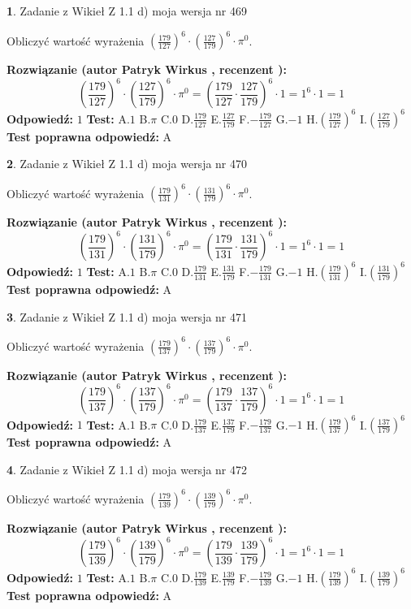\documentclass[12pt, a4paper]{article}
\theoremstyle{definition} %
\newtheorem{zad}{}
\newcommand{\zadStart}[1]{\begin{zad}#1\newline}
\newcommand{\zadStop}{\end{zad}}
\newcommand{\rozwStart}[2]{\noindent \textbf{Rozwiązanie (autor #1 , recenzent #2): }\newline}
\newcommand{\rozwStop}{\newline}
\newcommand{\odpStart}{\noindent \textbf{Odpowiedź:}\newline}
\newcommand{\odpStop}{\newline}
\newcommand{\testStart}{\noindent \textbf{Test:}\newline}
\newcommand{\testStop}{\newline}
\newcommand{\kluczStart}{\noindent \textbf{Test poprawna odpowiedź:}\newline}
\newcommand{\kluczStop}{\newline}
\begin{document}
\zadStart{Zadanie z Wikieł Z 1.1 d) moja wersja nr 469}

Obliczyć wartość wyrażenia $(\frac{179}{127})^{6} \cdot (\frac{127}{179})^{6} \cdot \pi^{0}$.
\zadStop
\rozwStart{Patryk Wirkus}{}
$$(\frac{179}{127})^{6} \cdot (\frac{127}{179})^{6} \cdot \pi^{0} = (\frac{179}{127} \cdot \frac{127}{179})^{6} \cdot 1 = 1^{6} \cdot 1 = 1$$
\rozwStop
\odpStart
$1$
\odpStop
\testStart
A.$1$ B.$\pi$ C.$0$ D.$\frac{179}{127}$ E.$\frac{127}{179}$
F.$-\frac{179}{127}$ G.$-1$
H.$(\frac{179}{127})^{6}$
I.$(\frac{127}{179})^{6}$
\testStop
\kluczStart
A
\kluczStop



\zadStart{Zadanie z Wikieł Z 1.1 d) moja wersja nr 470}

Obliczyć wartość wyrażenia $(\frac{179}{131})^{6} \cdot (\frac{131}{179})^{6} \cdot \pi^{0}$.
\zadStop
\rozwStart{Patryk Wirkus}{}
$$(\frac{179}{131})^{6} \cdot (\frac{131}{179})^{6} \cdot \pi^{0} = (\frac{179}{131} \cdot \frac{131}{179})^{6} \cdot 1 = 1^{6} \cdot 1 = 1$$
\rozwStop
\odpStart
$1$
\odpStop
\testStart
A.$1$ B.$\pi$ C.$0$ D.$\frac{179}{131}$ E.$\frac{131}{179}$
F.$-\frac{179}{131}$ G.$-1$
H.$(\frac{179}{131})^{6}$
I.$(\frac{131}{179})^{6}$
\testStop
\kluczStart
A
\kluczStop



\zadStart{Zadanie z Wikieł Z 1.1 d) moja wersja nr 471}

Obliczyć wartość wyrażenia $(\frac{179}{137})^{6} \cdot (\frac{137}{179})^{6} \cdot \pi^{0}$.
\zadStop
\rozwStart{Patryk Wirkus}{}
$$(\frac{179}{137})^{6} \cdot (\frac{137}{179})^{6} \cdot \pi^{0} = (\frac{179}{137} \cdot \frac{137}{179})^{6} \cdot 1 = 1^{6} \cdot 1 = 1$$
\rozwStop
\odpStart
$1$
\odpStop
\testStart
A.$1$ B.$\pi$ C.$0$ D.$\frac{179}{137}$ E.$\frac{137}{179}$
F.$-\frac{179}{137}$ G.$-1$
H.$(\frac{179}{137})^{6}$
I.$(\frac{137}{179})^{6}$
\testStop
\kluczStart
A
\kluczStop



\zadStart{Zadanie z Wikieł Z 1.1 d) moja wersja nr 472}

Obliczyć wartość wyrażenia $(\frac{179}{139})^{6} \cdot (\frac{139}{179})^{6} \cdot \pi^{0}$.
\zadStop
\rozwStart{Patryk Wirkus}{}
$$(\frac{179}{139})^{6} \cdot (\frac{139}{179})^{6} \cdot \pi^{0} = (\frac{179}{139} \cdot \frac{139}{179})^{6} \cdot 1 = 1^{6} \cdot 1 = 1$$
\rozwStop
\odpStart
$1$
\odpStop
\testStart
A.$1$ B.$\pi$ C.$0$ D.$\frac{179}{139}$ E.$\frac{139}{179}$
F.$-\frac{179}{139}$ G.$-1$
H.$(\frac{179}{139})^{6}$
I.$(\frac{139}{179})^{6}$
\testStop
\kluczStart
A
\kluczStop
\end{document}
